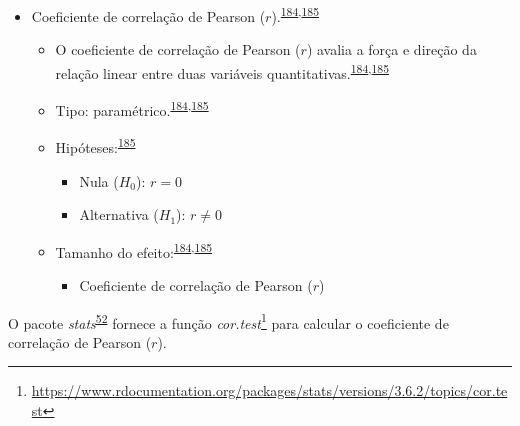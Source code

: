 \documentclass[
  a4paper,
]{book}
\providecommand{\tightlist}{%
  \setlength{\itemsep}{0pt}\setlength{\parskip}{0pt}}
\renewcommand{\href}[2]{#2\footnote{\url{#1}}}
\newenvironment{infobox}[1]
  {
  \begin{itemize}
  \renewcommand{\labelitemi}{
    \raisebox{-.7\height}[0pt][0pt]{
      {\setkeys{Gin}{width=3em,keepaspectratio}
        \texttt{[image: \#1]}}
    }
  }
  \setlength{\fboxsep}{1em}
  \begin{blackbox}
  \item
  }
  {
  \end{blackbox}
  \end{itemize}
  }
\begin{document}
\begin{itemize}
\item
  Coeficiente de correlação de Pearson (\(r\)).\textsuperscript{\protect\hyperlink{ref-khamis2008}{184},\protect\hyperlink{ref-allison2022}{185}}

  \begin{itemize}
  \item
    O coeficiente de correlação de Pearson (\(r\)) avalia a força e direção da relação linear entre duas variáveis quantitativas.\textsuperscript{\protect\hyperlink{ref-khamis2008}{184},\protect\hyperlink{ref-allison2022}{185}}
  \item
    Tipo: paramétrico.\textsuperscript{\protect\hyperlink{ref-khamis2008}{184},\protect\hyperlink{ref-allison2022}{185}}
  \item
    Hipóteses:\textsuperscript{\protect\hyperlink{ref-allison2022}{185}}

    \begin{itemize}
    \item
      Nula (\(H_{0}\)): \(r=0\)
    \item
      Alternativa (\(H_{1}\)): \(r≠0\)
    \end{itemize}
  \item
    Tamanho do efeito:\textsuperscript{\protect\hyperlink{ref-khamis2008}{184},\protect\hyperlink{ref-allison2022}{185}}

    \begin{itemize}
    \tightlist
    \item
      Coeficiente de correlação de Pearson (\(r\))
    \end{itemize}
  \end{itemize}
\end{itemize}

\begin{infobox}{images/Rlogo}
O pacote \emph{stats}\textsuperscript{\protect\hyperlink{ref-stats-2}{52}} fornece a função \href{https://www.rdocumentation.org/packages/stats/versions/3.6.2/topics/cor.test}{\emph{cor.test}} para calcular o coeficiente de correlação de Pearson (\(r\)).

\end{infobox}
\end{document}

